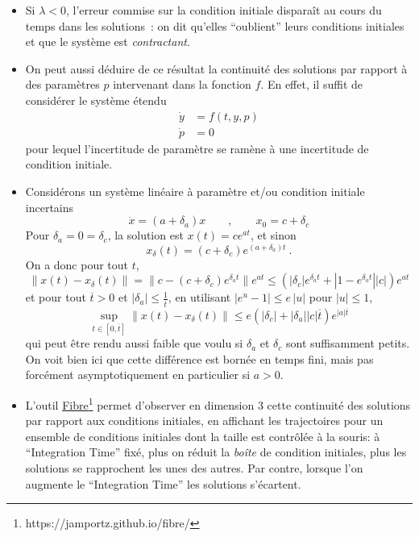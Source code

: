 \hypertarget{ex_contCI}{}
\begin{exemple}\label{ex_contCI}
\begin{itemize}
\item
  Si \(\lambda<0\), l'erreur commise sur la condition initiale disparaît
  au cours du temps dans les solutions~: on dit qu'elles ``oublient''
  leurs conditions initiales et que le système est \emph{contractant}.
\item
  On peut aussi déduire de ce résultat la continuité des solutions par
  rapport à des paramètres \(p\) intervenant dans la fonction \(f\). En
  effet, il suffit de considérer le système étendu \begin{align*}
  \dot{y} &= f(t,y,p)\\
  \dot{p} &= 0
  \end{align*} pour lequel l'incertitude de paramètre se ramène à une
  incertitude de condition initiale.
\item
  Considérons un système linéaire à paramètre et/ou condition initiale
  incertains \[
  \dot{x} = (a+\delta_a) x \qquad , \qquad x_0 = c +\delta_{c}
  \] Pour \(\delta_a=0=\delta_c\), la solution est \(x(t)=ce^{at}\), et
  sinon \[
  x_\delta(t)= (c+\delta_c)e^{(a+\delta_a)t} \ .
  \] On a donc pour tout \(t\), \[
  \|x(t)-x_\delta(t)\| = \|c- (c+\delta_c)e^{\delta_a t}\| e^{at} \leq \left(|\delta_c|e^{\delta_a t} + |1-e^{\delta_a t}| |c| \right) e^{at} 
  \] et pour tout \(\overline{t}>0\) et
  \(|\delta_a| \leq \frac{1}{\overline{t}}\), en utilisant
  \(|e^{u}-1|\leq e\,|u|\) pour \(|u|\leq 1\), \[
  \sup_{t\in [0,\overline{t}] } \|x(t)-x_\delta(t)\| \leq e\left( |\delta_c| + |\delta_a|  |c| \overline{t}\right) e^{|a|\overline{t}}
  \] qui peut être rendu aussi faible que voulu si \(\delta_a\) et
  \(\delta_c\) sont suffisamment petits. On voit bien ici que cette
  différence est bornée en temps fini, mais pas forcément
  asymptotiquement en particulier si \(a>0\).
\item
  L'outil \href{https://portsmouth.github.io/fibre/}{Fibre}\footnote{https://jamportz.github.io/fibre/}
  permet d'observer en dimension 3 cette continuité des solutions par
  rapport aux conditions initiales, en affichant les trajectoires pour
  un ensemble de conditions initiales dont la taille est contrôlée à la
  souris: à ``Integration Time'' fixé, plus on réduit la \emph{boîte} de
  condition initiales, plus les solutions se rapprochent les unes des
  autres. Par contre, lorsque l'on augmente le ``Integration Time'' les
  solutions s'écartent.
\end{itemize}
\end{exemple}

